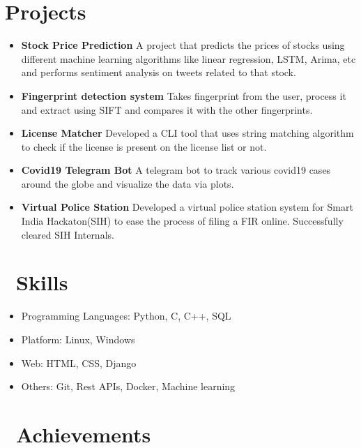 \documentclass{resume}
\begin{document}
\section{Projects}
\begin{itemize}
  \item \textbf{Stock Price Prediction} A project that predicts the prices of stocks using different machine learning algorithms like linear regression, LSTM, Arima, etc and performs sentiment analysis on tweets related to that stock.
  \item \textbf{Fingerprint detection system} Takes fingerprint from the user, process it and extract using SIFT and compares it with the other fingerprints.
  \item \textbf{License Matcher} Developed a CLI tool that uses string matching algorithm to check if the license is present on the license list or not.
  \item \textbf{Covid19 Telegram Bot} A telegram bot to track various covid19 cases around the globe and visualize the data via plots.
  \item \textbf{Virtual Police Station} Developed a virtual police station system for Smart India Hackaton(SIH) to ease the process of filing a FIR online. Successfully cleared SIH Internals.
\end{itemize}


\section{\faCogs\ Skills}
\begin{itemize}[parsep=0.5ex]
  \item Programming Languages: Python, C, C++, SQL
  \item Platform: Linux, Windows
  \item Web: HTML, CSS, Django
  \item Others: Git, Rest APIs, Docker, Machine learning
\end{itemize}

\section{\faHeartO\ Achievements}
\end{document}
